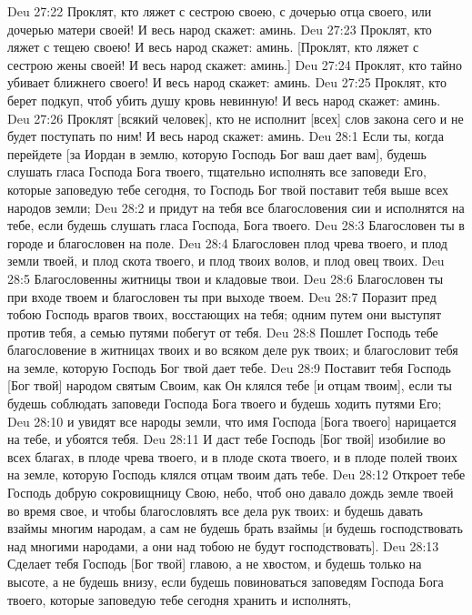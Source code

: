 \vs Deu 27:22 Проклят, кто ляжет с сестрою своею, с дочерью отца своего, или дочерью матери своей! И весь народ скажет: аминь.
\vs Deu 27:23 Проклят, кто ляжет с тещею своею! И весь народ скажет: аминь. [Проклят, кто ляжет с сестрою жены своей! И весь народ скажет: аминь.]
\rsbpar\vs Deu 27:24 Проклят, кто тайно убивает ближнего своего! И весь народ скажет: аминь.
\vs Deu 27:25 Проклят, кто берет подкуп, чтоб убить душу  кровь невинную! И весь народ скажет: аминь.
\vs Deu 27:26 Проклят [всякий человек], кто не исполнит [всех] слов закона сего и не будет поступать по ним! И весь народ скажет: аминь.
\vs Deu 28:1 Если ты, когда перейдете [за Иордан в землю, которую Господь Бог ваш дает вам], будешь слушать гласа Господа Бога твоего, тщательно исполнять все заповеди Его, которые заповедую тебе сегодня, то Господь Бог твой поставит тебя выше всех народов земли;
\vs Deu 28:2 и придут на тебя все благословения сии и исполнятся на тебе, если будешь слушать гласа Господа, Бога твоего.
\vs Deu 28:3 Благословен ты в городе и благословен на поле.
\vs Deu 28:4 Благословен плод чрева твоего, и плод земли твоей, и плод скота твоего, и плод твоих волов, и плод овец твоих.
\vs Deu 28:5 Благословенны житницы твои и кладовые твои.
\vs Deu 28:6 Благословен ты при входе твоем и благословен ты при выходе твоем.
\vs Deu 28:7 Поразит пред тобою Господь врагов твоих, восстающих на тебя; одним путем они выступят против тебя, а семью путями побегут от тебя.
\vs Deu 28:8 Пошлет Господь тебе благословение в житницах твоих и во всяком деле рук твоих; и благословит тебя на земле, которую Господь Бог твой дает тебе.
\vs Deu 28:9 Поставит тебя Господь [Бог твой] народом святым Своим, как Он клялся тебе [и отцам твоим], если ты будешь соблюдать заповеди Господа Бога твоего и будешь ходить путями Его;
\vs Deu 28:10 и увидят все народы земли, что имя Господа [Бога твоего] нарицается на тебе, и убоятся тебя.
\vs Deu 28:11 И даст тебе Господь [Бог твой] изобилие во всех благах, в плоде чрева твоего, и в плоде скота твоего, и в плоде полей твоих на земле, которую Господь клялся отцам твоим дать тебе.
\vs Deu 28:12 Откроет тебе Господь добрую сокровищницу Свою, небо, чтоб оно давало дождь земле твоей во время свое, и чтобы благословлять все дела рук твоих: и будешь давать взаймы многим народам, а сам не будешь брать взаймы [и будешь господствовать над многими народами, а они над тобою не будут господствовать].
\vs Deu 28:13 Сделает тебя Господь [Бог твой] главою, а не хвостом, и будешь только на высоте, а не будешь внизу, если будешь повиноваться заповедям Господа Бога твоего, которые заповедую тебе сегодня хранить и исполнять,
